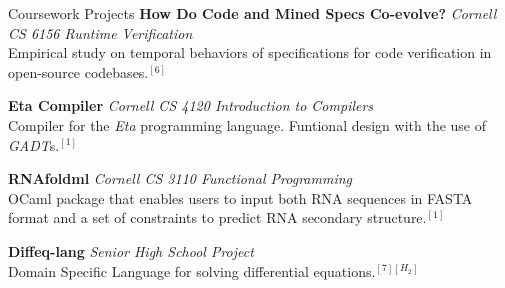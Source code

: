  
\begin{rSection}{Coursework Projects}
	\textbf{How Do Code and Mined Specs Co-evolve?} \textit{Cornell CS 6156 Runtime Verification} \\
	Empirical study on temporal behaviors of specifications for code verification in open-source codebases.$^{[6]}$ 

	\textbf{Eta Compiler} \textit{Cornell CS 4120 Introduction to Compilers} \\
	Compiler for the \textit{Eta} programming language. Funtional design with the use of \textit{GADT}s.$^{[1]}$ 

	\textbf{RNAfoldml} \textit{Cornell CS 3110 Functional Programming} \href{https://github.com/jpVinnie/RNAfoldml/}{\ExternalLink} \\
	OCaml package that enables users to input both RNA sequences in FASTA format and a set of constraints to predict RNA secondary structure.$^{[1]}$

	\textbf{Diffeq-lang} \textit{Senior High School Project} \href{https://github.com/jpVinnie/diffeq-lang/}{\ExternalLink} \\
	Domain Specific Language for solving differential equations.$^{[7][H_2]}$

\end{rSection}